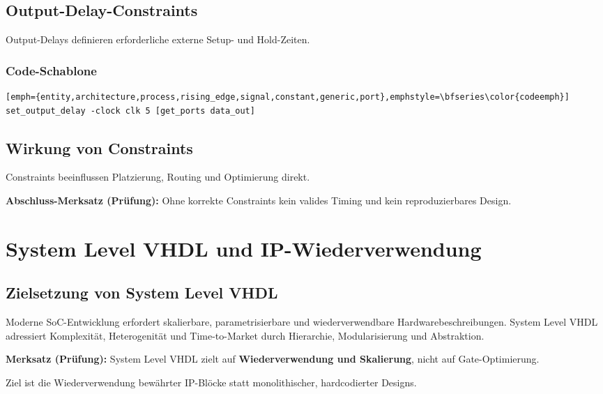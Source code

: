 \documentclass[10pt,a4paper]{article}
\newcommand{\hilite}[1]{\colorbox{yellow!25}{#1}}
\newcommand{\imp}[1]{\textbf{\textcolor{codeemph}{#1}}}
\begin{document}
\begin{multicols}{3}
\subsection{Output-Delay-Constraints}
Output-Delays definieren erforderliche externe Setup- und Hold-Zeiten.

\subsubsection*{Code-Schablone}
\begin{lstlisting}[emph={entity,architecture,process,rising_edge,signal,constant,generic,port},emphstyle=\bfseries\color{codeemph}][emph={entity,architecture,process,rising_edge,signal,constant,generic,port},emphstyle=\bfseries\color{codeemph}]
set_output_delay -clock clk 5 [get_ports data_out]
\end{lstlisting}

\subsection{Wirkung von Constraints}
Constraints beeinflussen Platzierung, Routing und Optimierung direkt.

\imp{Abschluss-Merksatz (Prüfung):}  
Ohne korrekte \hilite{Constraints} kein valides Timing und kein reproduzierbares Design.

\section{\hilite{System Level VHDL} und IP-\hilite{Wiederverwendung}}

\subsection{Zielsetzung von System Level VHDL}
Moderne SoC-Entwicklung erfordert skalierbare, parametrisierbare und wiederverwendbare Hardwarebeschreibungen. System Level VHDL adressiert Komplexität, Heterogenität und Time-to-Market durch Hierarchie, Modularisierung und Abstraktion.

\imp{Merksatz (Prüfung):}  
\hilite{System Level VHDL} zielt auf \textbf{\hilite{Wiederverwendung} und \hilite{Skalierung}}, nicht auf Gate-Optimierung.

Ziel ist die Wiederverwendung bewährter IP-Blöcke statt monolithischer, hardcodierter Designs.


\end{multicols}
\end{document}
